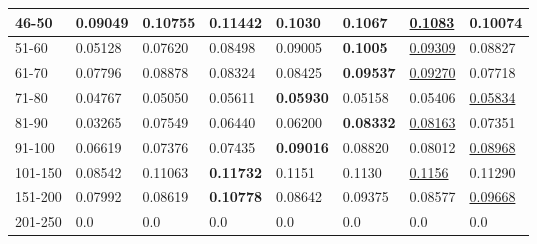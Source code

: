 \begin{table*}[]
\begin{tabular}{|l|l|l|l|l|l|l||l|}
        46-50       & 0.09049                        & 0.10755                        & \textbf{0.11442}               & 0.1030                         & 0.1067                         & \underline{0.1083}              & 0.10074                    \\ \hline
        51-60       & 0.05128                        & 0.07620                        & 0.08498                        & 0.09005                        & \textbf{0.1005}                & \underline{0.09309}             & 0.08827                    \\ \hline
        61-70       & 0.07796                        & 0.08878                        & 0.08324                        & 0.08425                        & \textbf{0.09537}               & \underline{0.09270}             & 0.07718                    \\ \hline
        71-80       & 0.04767                        & 0.05050                        & 0.05611                        & \textbf{0.05930}               & 0.05158                        & 0.05406                         & \underline{0.05834}        \\ \hline
        81-90       & 0.03265                        & 0.07549                        & 0.06440                        & 0.06200                        & \textbf{0.08332}               & \underline{0.08163}             & 0.07351                    \\ \hline
        91-100      & 0.06619                        & 0.07376                        & 0.07435                        & \textbf{0.09016}               & 0.08820                        & 0.08012                         & \underline{0.08968}        \\ \hline
        101-150     & 0.08542                        & 0.11063                        & \textbf{0.11732}               & 0.1151                         & 0.1130                         & \underline{0.1156}              & 0.11290                    \\ \hline
        151-200     & 0.07992                        & 0.08619                        & \textbf{0.10778}               & 0.08642                        & 0.09375                        & 0.08577                         & \underline{0.09668}        \\ \hline
        201-250     & 0.0                            & 0.0                            & 0.0                            & 0.0                            & 0.0                            & 0.0                             & 0.0                        \\ \hline

\end{tabular}
\end{table*}
